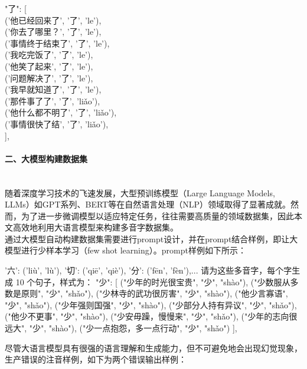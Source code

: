 \documentclass[12pt,hyperref,a4paper,UTF8]{ctexart}
\begin{document}
\begin{enumerate}
  
  \begin{tcolorbox}
    "了": [\\
      ('他已经回来了', '了', 'le'),\\
      ('你去了哪里？', '了', 'le'),\\
      ('事情终于结束了', '了', 'le'),\\
      ('我吃完饭了', '了', 'le'),\\
      ('他笑了起来', '了', 'le'),\\
      ('问题解决了', '了', 'le'),\\
      ('我早就知道了', '了', 'le'),\\
      ('那件事了了', '了', 'liǎo'),\\
      ('他什么都不明了', '了', 'liǎo'),\\
      ('事情很快了结', '了', 'liǎo'),\\
      ],
  \end{tcolorbox}
  \end{enumerate}
  \paragraph{二、大模型构建数据集}\leavevmode\\
  \indent 随着深度学习技术的飞速发展，大型预训练模型（Large Language Models, LLMs）如GPT系列、BERT等在自然语言处理（NLP）领域取得了显著成就。然而，为了进一步微调模型以适应特定任务，往往需要高质量的领域数据集，因此本文高效地利用大语言模型来构建多音字数据集。\\
  \indent 通过大模型自动构建数据集需要进行prompt设计，并在prompt结合样例，即让大模型进行少样本学习（few shot learning）。prompt样例如下所示：
  \begin{tcolorbox}
    '六': ('liù', 'lù'), '切': ('qiē', 'qiè'), '分': ('fēn', 'fèn'),... 请为这些多音字，每个字生成 10 个句子，样式为： "少": [ ("少年的时光很宝贵", "少", "shào"), ("少数服从多数是原则", "少", "shǎo"), ("少林寺的武功很厉害", "少", "shào"), ("他少言寡语", "少", "shǎo"), ("少年强则国强", "少", "shào"), ("少部分人持有异议", "少", "shǎo"), ("他少不更事", "少", "shào"), ("少安毋躁，慢慢来", "少", "shǎo"), ("少年的志向很远大", "少", "shào"), ("少一点抱怨，多一点行动", "少", "shǎo") ], 
  \end{tcolorbox}
  \indent 尽管大语言模型具有很强的语言理解和生成能力，但不可避免地会出现幻觉现象，生产错误的注音样例，如下为两个错误输出样例：
\end{document}
